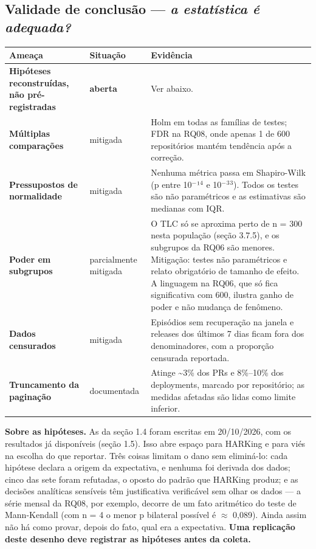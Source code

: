 \documentclass[12pt]{article}
\begin{document}
\subsection{Validade de conclusão — \emph{a estatística é adequada?}}

\begin{table}[!htbp]
\centering
\scriptsize
\begin{tabular}{p{}p{}p{}}
\toprule
\textbf{Ameaça} & \textbf{Situação} & \textbf{Evidência} \\
\midrule
\textbf{Hipóteses reconstruídas, não pré-registradas} & \textbf{aberta} & Ver abaixo. \\
\textbf{Múltiplas comparações} & mitigada & Holm em todas as famílias de testes; FDR na RQ08, onde apenas 1 de 600 repositórios mantém tendência após a correção. \\
\textbf{Pressupostos de normalidade} & mitigada & Nenhuma métrica passa em Shapiro-Wilk (p entre 10$^-$¹$^4$ e 10$^-$$^3$$^3$). Todos os testes são não paramétricos e as estimativas são medianas com IQR. \\
\textbf{Poder em subgrupos} & parcialmente mitigada & O TLC só se aproxima perto de n = 300 nesta população (seção 3.7.5), e os subgrupos da RQ06 são menores. Mitigação: testes não paramétricos e relato obrigatório de tamanho de efeito. A linguagem na RQ06, que só fica significativa com 600, ilustra ganho de poder e não mudança de fenômeno. \\
\textbf{Dados censurados} & mitigada & Episódios sem recuperação na janela e releases dos últimos 7 dias ficam fora dos denominadores, com a proporção censurada reportada. \\
\textbf{Truncamento da paginação} & documentada & Atinge \textasciitilde{}3\% dos PRs e 8\%–10\% dos deployments, marcado por repositório; as medidas afetadas são lidas como limite inferior. \\
\bottomrule
\end{tabular}
\end{table}

\textbf{Sobre as hipóteses.} As da seção 1.4 foram escritas em 20/10/2026, com os resultados já disponíveis (seção 1.5). Isso abre espaço para HARKing e para viés na escolha do que reportar. Três coisas limitam o dano sem eliminá-lo: cada hipótese declara a origem da expectativa, e nenhuma foi derivada dos dados; cinco das sete foram refutadas, o oposto do padrão que HARKing produz; e as decisões analíticas sensíveis têm justificativa verificável sem olhar os dados — a série mensal da RQ08, por exemplo, decorre de um fato aritmético do teste de Mann-Kendall (com n = 4 o menor p bilateral possível é $\approx$ 0,089). Ainda assim não há como provar, depois do fato, qual era a expectativa. \textbf{Uma replicação deste desenho deve registrar as hipóteses antes da coleta.}
\end{document}
